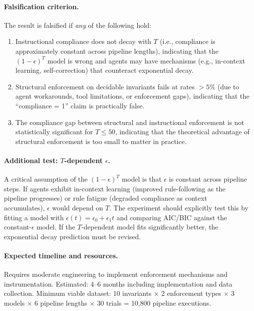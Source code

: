 \documentclass[11pt, a4paper]{googledeepmind}
\begin{document}
\paragraph{Falsification criterion.} The result is falsified if \emph{any} of the following hold:
\begin{enumerate}[nosep]
    \item Instructional compliance does not decay with $T$ (i.e., compliance is approximately constant across pipeline lengths), indicating that the $(1-\epsilon)^T$ model is wrong and agents may have mechanisms (e.g., in-context learning, self-correction) that counteract exponential decay.
    \item Structural enforcement on decidable invariants fails at rates $> 5\%$ (due to agent workarounds, tool limitations, or enforcement gaps), indicating that the ``compliance = 1'' claim is practically false.
    \item The compliance gap between structural and instructional enforcement is not statistically significant for $T \leq 50$, indicating that the theoretical advantage of structural enforcement is too small to matter in practice.
\end{enumerate}

\paragraph{Additional test: $T$-dependent $\epsilon$.} A critical assumption of the $(1-\epsilon)^T$ model is that $\epsilon$ is constant across pipeline steps. If agents exhibit in-context learning (improved rule-following as the pipeline progresses) or rule fatigue (degraded compliance as context accumulates), $\epsilon$ would depend on $T$. The experiment should explicitly test this by fitting a model with $\epsilon(t) = \epsilon_0 + \epsilon_1 t$ and comparing AIC/BIC against the constant-$\epsilon$ model. If the $T$-dependent model fits significantly better, the exponential decay prediction must be revised.

\paragraph{Expected timeline and resources.} Requires moderate engineering to implement enforcement mechanisms and instrumentation. Estimated: 4--6 months including implementation and data collection. Minimum viable dataset: 10 invariants $\times$ 2 enforcement types $\times$ 3 models $\times$ 6 pipeline lengths $\times$ 30 trials = 10,800 pipeline executions.
\end{document}
